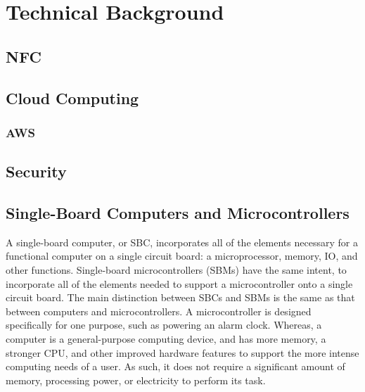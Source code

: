 \documentclass[12pt]{report}
\let\Oldsection\section
\renewcommand{\section}{\FloatBarrier\Oldsection}
\let\Oldsubsection\subsection
\renewcommand{\subsection}{\FloatBarrier\Oldsubsection}
\begin{document}
\chapter{Technical Background} \label{technical-background}


\section{NFC} \label{nfc}


\section{Cloud Computing} \label{cloud-computing}



\subsection{AWS} \label{aws}


\section{Security} \label{security}


\section{Single-Board Computers and Microcontrollers} \label{single-board-computers-and-microcontrollers}

A single-board computer, or SBC, incorporates all of the elements necessary for a functional 
computer on a single circuit board: a microprocessor, memory, IO, and other functions. Single-board microcontrollers
(SBMs) have the same intent, to incorporate all of the elements needed to support a microcontroller onto a single
circuit board. The main distinction between SBCs and SBMs is the same as that between computers and microcontrollers.
A microcontroller is designed specifically for one  purpose, such as powering an alarm clock. Whereas, a
computer is a general-purpose computing device, and has more memory, a stronger CPU, and other improved hardware 
features to support the more intense computing needs of a user. As such, it does not require a significant amount of
memory, processing power, or electricity to perform its task.
\end{document}
